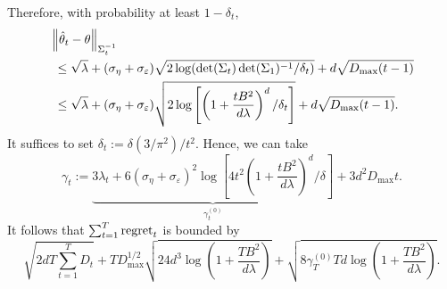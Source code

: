 \documentclass[letterpaper,11pt]{article}
\begin{document}
Therefore, with probability at least $1 - \delta_{t}$, 
\begin{equation*}
\begin{aligned}
    &\left\|\hat{\theta}_t - \theta\right\|_{\Sigma_t^{-1}} \\
    &~\leq \sqrt{\lambda} + (\sigma_{\eta} + \sigma_{\varepsilon})\sqrt{2 \log (\det(\Sigma_t)\det(\Sigma_1)^{-1} / \delta_t)} + d\sqrt{D_{\max}(t-1)} \\
    &~\leq \sqrt{\lambda} + (\sigma_{\eta} + \sigma_{\varepsilon})\sqrt{2 \log \left[\left(1 + \frac{t B^2}{d \lambda}\right)^d/\delta_t\right]} + d\sqrt{D_{\max}(t-1)}. 
\end{aligned}
\end{equation*}
It suffices to set $\delta_t := \delta (3/\pi^2)/t^2$.
Hence, we can take 
\begin{equation*}
    \gamma_t := \underbrace{3\lambda_t + 6(\sigma_{\eta} + \sigma_{\varepsilon})^2 \log \left[4 t^2\left(1 + \frac{t B^2}{d \lambda}\right)^d/\delta\right]}_{\gamma^{(0)}_t} + 3d^2 D_{\max} t.
\end{equation*}
It follows that $\sum_{t=1}^T \mathrm{regret}_t$ is bounded by
\begin{equation*}
    \sqrt{2dT\sum_{t=1}^T D_t} + T D_{\max}^{1/2} \sqrt{24 d^3 \log \left(1 + \frac{T B^2}{d \lambda}\right)} + \sqrt{8 \gamma^{(0)}_T T d \log\left(1 + \frac{T B^2}{d \lambda}\right)} . 
\end{equation*}

\end{document}
